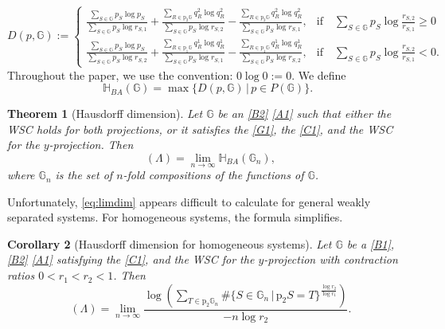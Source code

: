\documentclass[a4paper, 11pt]{article}
\DeclareMathOperator{\dH}{\dim_{\mathrm{H}}}
\numberwithin{equation}{section}
\theoremstyle{plain}
\newtheorem{theorem}{Theorem}[section]
\newtheorem{corollary}[theorem]{Corollary}
\theoremstyle{remark}
\theoremstyle{definition}
\begin{document}
\begin{equation} \label{DpG}
	D(p,\mathbb{G}) := \begin{cases}
		\displaystyle
		\frac{\sum\limits_{S \in \mathbb{G}} p_S \log p_S}{\sum\limits_{S \in \mathbb{G}} p_S \log r_{S,1}}
		+ \frac{\sum\limits_{R \in \mathrm{p}_2\mathbb{G}} q_{R}^2 \log q_{R}^2}{\sum\limits_{S \in \mathbb{G}} p_S \log r_{S,2}}
		- \frac{\sum\limits_{R \in \mathrm{p}_2\mathbb{G}} q_{R}^2 \log q_{R}^2}{\sum\limits_{S \in \mathbb{G}} p_S \log r_{S,1}},  & \text{if} \quad \sum\limits_{S \in \mathbb{G}} p_S \log\frac{r_{S,2}}{ r_{S,1}} \geq 0 \\[25pt]
		\displaystyle
		\frac{\sum\limits_{S \in \mathbb{G}} p_S \log p_S}{\sum\limits_{S \in \mathbb{G}} p_S \log r_{S,2}}
		+ \frac{\sum\limits_{R \in \mathrm{p}_1\mathbb{G}} q_{R}^1 \log q_{R}^1}{\sum\limits_{S \in \mathbb{G}} p_S \log r_{S,1}}
		- \frac{\sum\limits_{R \in\mathrm{p}_1\mathbb{G}} q_{R}^1 \log q_{R}^1}{\sum\limits_{S \in \mathbb{G}} p_S \log r_{S,2}},  & \text{if} \quad \sum\limits_{S \in \mathbb{G}} p_S \log\frac{r_{S,2}}{r_{S,1}} < 0.
	\end{cases}
\end{equation}
Throughout the paper, we use the convention: $0\log 0:=0$. We define
$$
\mathbb{H}_{BA}(\mathbb{G})=\max\{D(p,\mathbb{G})\, \big|\, p \in P(\mathbb{G})\}.
$$

\begin{theorem}[Hausdorff dimension] \label{th}
Let $\mathbb{G}$ be an \ref{B2} \ref{A1} such that either the WSC holds for both projections, or it satisfies the \ref{G1}, the \ref{C1}, and the WSC for the $y$-projection. Then
\begin{equation}\label{eq:limdim}
\dH(\Lambda) = \lim_{n \to \infty} \mathbb{H}_{BA}(\mathbb{G}_n),
\end{equation}
where $\mathbb{G}_n$ is the set of $n$-fold compositions of the functions of $\mathbb{G}$.
\end{theorem}

Unfortunately, \eqref{eq:limdim} appears difficult to calculate for general weakly separated systems. For homogeneous systems, the formula simplifies.

\begin{corollary}[Hausdorff dimension for homogeneous systems] \label{T3}
	Let $\mathbb{G}$ be a \ref{B1}, \ref{B2} \ref{A1} satisfying the \ref{C1}, and the WSC for the $y$-projection with contraction ratios $0<r_1 < r_2<1$. Then
	\begin{equation*}
		\dH(\Lambda) = \lim_{n \to \infty}\frac{\log\left(\sum_{T \in \mathrm{p}_2\mathbb{G}_n} \#\{S\in\mathbb{G}_n\, \big|\, \mathrm{p}_{2} S=T\}^{\frac{\log r_2}{\log r_1}}\right)}{{-}n\log r_2}.
	\end{equation*}
\end{corollary}
\end{document}
